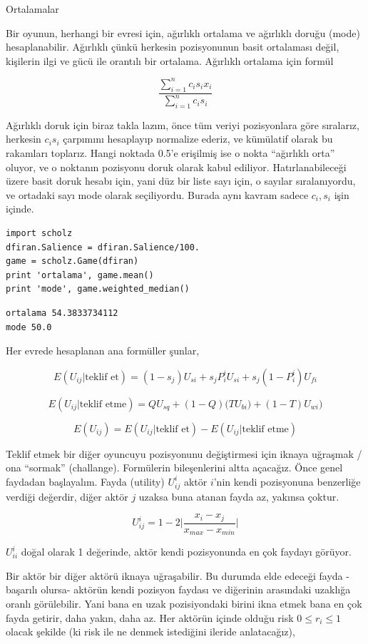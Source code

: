 \documentclass[12pt,fleqn]{article}\usepackage{../../common}
\begin{document}
Ortalamalar

Bir oyunun, herhangi bir evresi için, ağırlıklı ortalama ve ağırlıklı doruğu
(mode) hesaplanabilir. Ağırlıklı çünkü herkesin pozisyonunun basit ortalaması
değil, kişilerin ilgi ve gücü ile orantılı bir ortalama. Ağırlıklı ortalama için
formül

$$ \frac{\sum_{i=1}^{n} c_i s_i x_i}{\sum_{i=1}^{n} c_i s_i} $$

Ağırlıklı doruk için biraz takla lazım, önce tüm veriyi pozisyonlara göre
sıralarız, herkesin $c_is_i$ çarpımını hesaplayıp normalize ederiz, ve kümülatif
olarak bu rakamları toplarız. Hangi noktada 0.5'e erişilmiş ise o nokta
``ağırlıklı orta'' oluyor, ve o noktanın pozisyonu doruk olarak kabul
ediliyor. Hatırlanabileceği üzere basit doruk hesabı için, yani düz bir liste
sayı için, o sayılar sıralanıyordu, ve ortadaki sayı mode olarak
seçiliyordu. Burada aynı kavram sadece $c_i,s_i$ işin içinde.

\begin{verbatim}
import scholz
dfiran.Salience = dfiran.Salience/100.
game = scholz.Game(dfiran)
print 'ortalama', game.mean()
print 'mode', game.weighted_median()
\end{verbatim}

\begin{verbatim}
ortalama 54.3833734112
mode 50.0
\end{verbatim}

Her evrede hesaplanan ana formüller şunlar,

$$ E(U_{ij}|\textrm{teklif et}) = (1-s_j)U_{si} + s_jP_i^i U_{si} + s_j(1-P_i^i)U_{fi} $$

$$ E(U_{ij}|\textrm{teklif etme}) = QU_{sq} + (1-Q) \big( T U_{bi}) + (1-T)U_{wi} \big)$$

$$ E(U_{ij}) = E(U_{ij}|\textrm{teklif et}) - E(U_{ij}|\textrm{teklif etme}) $$

Teklif etmek bir diğer oyuncuyu pozisyonunu değiştirmesi için iknaya uğraşmak /
ona ``sormak'' (challange).  Formülerin bileşenlerini altta açacağız. Önce genel
faydadan başlayalım. Fayda (utility) $U_{ij}^i$ aktör $i$'nin kendi pozisyonuna
benzerliğe verdiği değerdir, diğer aktör $j$ uzaksa buna atanan fayda az,
yakınsa çoktur.

$$ U_{ij}^i = 1-2 \bigg| \frac{x_i - x_j}{x_{max}-x_{min}}\bigg|   $$

$U_{ii}^i$ doğal olarak 1 değerinde, aktör kendi pozisyonunda en çok
faydayı görüyor. 

Bir aktör bir diğer aktörü iknaya uğraşabilir. Bu durumda elde edeceği
fayda -başarılı olursa- aktörün kendi pozisyon faydası ve diğerinin
arasındaki uzaklığa oranlı görülebilir. Yani bana en uzak pozisiyondaki
birini ikna etmek bana en çok fayda getirir, daha yakın, daha az. Her
aktörün içinde olduğu risk $ 0 \le r_i \le 1$ olacak şekilde (ki risk ile
ne denmek istediğini ileride anlatacağız),
\end{document}
